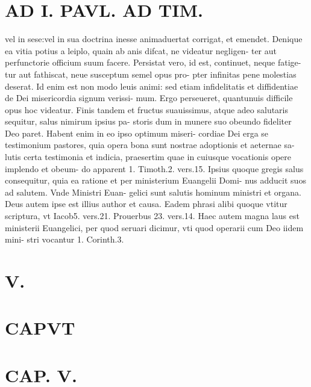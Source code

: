 \documentclass{article}
\begin{document}
\begin{pages}
\section*{AD I. PAVL. AD TIM. }
\marginpar{[ p.230 ]}\pstart vel in sese:vel in sua doctrina inesse animaduertat corrigat, et emendet. Denique ea vitia potius a leiplo, quain ab anis difcat, ne videatur negligen- ter aut perfunctorie officium suum facere.  \pend\pstart Persistat vero, id est, continuet, neque fatige- tur aut fathiscat, neue susceptum semel opus pro- pter infinitas pene molestias deserat. Id enim est non modo leuis animi: sed etiam infidelitatis et diffidentiae de Dei misericordia signum verissi- mum. Ergo perseueret, quantunuis difficile opus hoc videatur.  \pend\pstart Finis tandem et fructus suauissimus, atque adeo salutaris sequitur, salus nimirum ipsius pa- storis dum in munere suo obeundo fideliter Deo paret. Habent enim in eo ipso optimum miseri- cordiae Dei erga se testimonium pastores, quia opera bona sunt nostrae adoptionis et aeternae sa- lutis certa testimonia et indicia, praesertim quae in cuiusque vocationis opere implendo et obeum- do apparent 1. Timoth.2. vers.15.  \pend\pstart Ipsius quoque gregis salus consequitur, quia ea ratione et per ministerium Euangelii Domi- nus adducit suos ad salutem. Vnde Ministri Euan- gelici sunt salutis hominum ministri et organa. Deus autem ipse est illius author et causa. Eadem phrasi alibi quoque vtitur scriptura, vt Iacob5. vers.21. Prouerbus  23. vers.14. Haec autem magna laus est ministerii Euangelici, per quod seruari dicimur, vti quod operarii cum Deo iidem mini- stri vocantur 1. Corinth.3.  \pend
\section*{V. }
\section*{CAPVT  }
\marginpar{[ p.239 ]}
\endnumbering\beginnumbering\section{CAP. V.}
{}

\end{pages}
\end{document}
